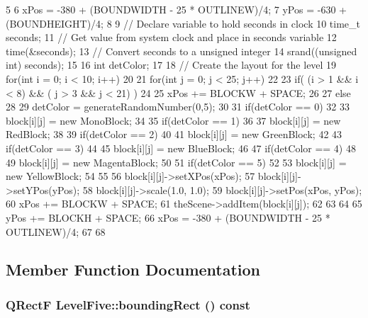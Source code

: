 \begin{DoxyCode}
5 {
6     xPos = -380 + (BOUNDWIDTH - 25 * OUTLINEW)/4;
7     yPos = -630 + (BOUNDHEIGHT)/4;
8 
9     // Declare variable to hold seconds in clock
10     time_t seconds;
11     // Get value from system clock and place in seconds variable
12     time(&seconds);
13     // Convert seconds to a unsigned integer
14     srand((unsigned int) seconds);
15 
16     int detColor;
17 
18     // Create the layout for the level
19     for(int i = 0; i < 10; i++)
20     {
21         for(int j = 0; j < 25; j++)
22         {
23             if( (i > 1 && i < 8) && ( j > 3 && j < 21) )
24             {
25                  xPos += BLOCKW + SPACE;
26             }
27             else
28             {
29                 detColor = generateRandomNumber(0,5);
30 
31                 if(detColor == 0)
32                 {
33                     block[i][j] = new MonoBlock;
34                 }
35                 if(detColor == 1)
36                 {
37                     block[i][j] = new RedBlock;
38                 }
39                 if(detColor == 2)
40                 {
41                     block[i][j] = new GreenBlock;
42                 }
43                 if(detColor == 3)
44                 {
45                     block[i][j] = new BlueBlock;
46                 }
47                 if(detColor == 4)
48                 {
49                     block[i][j] = new MagentaBlock;
50                 }
51                 if(detColor == 5)
52                 {
53                     block[i][j] = new YellowBlock;
54                 }
55 
56                 block[i][j]->setXPos(xPos);
57                 block[i][j]->setYPos(yPos);
58                 block[i][j]->scale(1.0, 1.0);
59                 block[i][j]->setPos(xPos, yPos);
60                 xPos += BLOCKW + SPACE;
61                 theScene->addItem(block[i][j]);
62             }
63         }
64 
65         yPos += BLOCKH + SPACE;
66         xPos = -380 + (BOUNDWIDTH - 25 * OUTLINEW)/4;
67     }
68 }
\end{DoxyCode}


\subsection{Member Function Documentation}
\hypertarget{class_level_five_ab9b179447ae7546beec7e7e9936e0178}{
\subsubsection[{boundingRect}]{\setlength{\rightskip}{0pt plus 5cm}QRectF LevelFive::boundingRect () const}}
\label{class_level_five_ab9b179447ae7546beec7e7e9936e0178}


